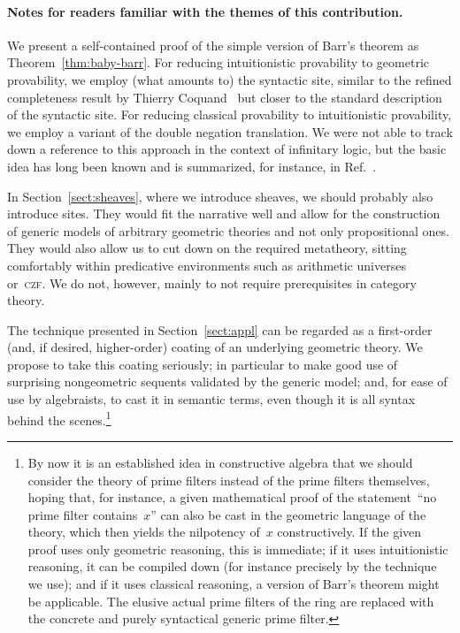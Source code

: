 \documentclass{ws-rv9x6}
\begin{document}
{\paragraph{Notes for readers familiar with the themes of this contribution.}
We present a self-contained proof of the simple
version of Barr's theorem as Theorem~\ref{thm:baby-barr}. For reducing
intuitionistic provability to geometric provability, we employ (what amounts
to) the syntactic site, similar to the refined completeness result
by Thierry Coquand~\cite{coquand:site} but closer to the standard description
of the syntactic site. For reducing classical provability to intuitionistic
provability, we employ a variant of the double negation translation. We were
not able to track down a reference to this approach in the context of
infinitary logic, but the basic idea has long been known and is summarized, for
instance, in Ref.~.

In Section~\ref{sect:sheaves}, where we introduce sheaves, we should
probably also introduce sites. They would fit the narrative well and allow for
the construction of generic models of arbitrary geometric theories and not only
propositional ones. They would also allow us to cut down on the required metatheory,
sitting comfortably within predicative environments such as arithmetic
universes~\cite{maietti:au,vickers:sketches} or~\textsc{czf}.
We do not, however, mainly to not require
prerequisites in category theory.

The technique presented in Section~\ref{sect:appl} can be
regarded as a first-order (and, if desired, higher-order) coating of an
underlying geometric theory. We propose to take this coating seriously; in
particular to make good use of surprising nongeometric sequents validated by the
generic model; and, for ease of use by algebraists, to cast it in semantic terms,
even though it is all syntax behind the scenes.\footnote{By now it is an established idea in constructive algebra that we should
consider the theory of prime filters instead of the prime filters themselves,
hoping that, for instance, a given mathematical proof of the statement~``no
prime filter contains~$x$'' can also be cast in the
geometric language of the theory, which then yields the nilpotency of~$x$
constructively. If the given proof uses only geometric reasoning, this is
immediate; if it uses intuitionistic reasoning, it can be compiled down (for
instance precisely by the technique we use); and if it uses classical reasoning, a
version of Barr's theorem might be applicable. The elusive actual prime filters
of the ring are replaced with the concrete and purely syntactical generic prime
filter.

}}
\end{document}
